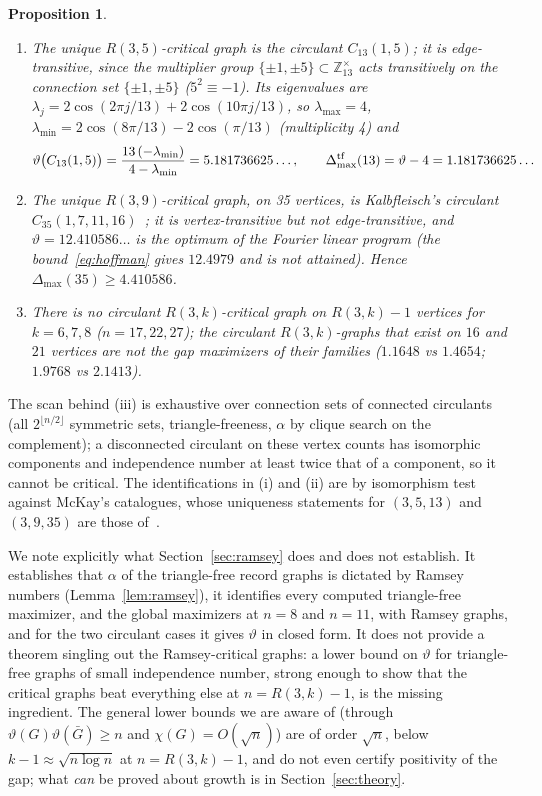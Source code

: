 \documentclass[11pt]{article}
\newtheorem{proposition}{Proposition}
\renewcommand{\theta}{\vartheta}
\newcommand{\gap}{\Delta}
\begin{document}
\begin{proposition}\label{prop:circ}
\begin{enumerate}
\item[(i)] The unique $R(3,5)$-critical graph is the circulant $C_{13}(1,5)$; it is edge-transitive, since the multiplier group $\{\pm1,\pm5\}\subset\mathbb Z_{13}^\times$ acts transitively on the connection set $\{\pm1,\pm5\}$ ($5^2\equiv-1$). Its eigenvalues are $\lambda_j=2\cos(2\pi j/13)+2\cos(10\pi j/13)$, so $\lambda_{\max}=4$, $\lambda_{\min}=2\cos(8\pi/13)-2\cos(\pi/13)$ (multiplicity 4) and
\begin{equation}
\theta\bigl(C_{13}(1,5)\bigr)=\frac{13\,(-\lambda_{\min})}{4-\lambda_{\min}}=5.181736625\ldots,\qquad \gap_{\max}^{\rm tf}(13)=\theta-4=1.181736625\ldots
\end{equation}
\item[(ii)] The unique $R(3,9)$-critical graph, on 35 vertices, is Kalbfleisch's circulant $C_{35}(1,7,11,16)$~\cite{kalbfleisch1966}; it is vertex-transitive but not edge-transitive, and $\theta=12.410586\ldots$ is the optimum of the Fourier linear program (the bound~\eqref{eq:hoffman} gives $12.4979$ and is not attained). Hence $\gap_{\max}(35)\ge 4.410586$. %
\item[(iii)] There is no circulant $R(3,k)$-critical graph on $R(3,k)-1$ vertices for $k=6,7,8$ ($n=17,22,27$); the circulant $R(3,k)$-graphs that exist on $16$ and $21$ vertices are not the gap maximizers of their families ($1.1648$ vs $1.4654$; $1.9768$ vs $2.1413$).
\end{enumerate}
\end{proposition}
The scan behind (iii) is exhaustive over connection sets of connected circulants (all $2^{\lfloor n/2\rfloor}$ symmetric sets, triangle-freeness, $\alpha$ by clique search on the complement); a disconnected circulant on these vertex counts has isomorphic components and independence number at least twice that of a component, so it cannot be critical. The identifications in (i) and (ii) are by isomorphism test against McKay's catalogues, whose uniqueness statements for $(3,5,13)$ and $(3,9,35)$ are those of~\cite{radziszowski}.

We note explicitly what Section~\ref{sec:ramsey} does and does not establish. It establishes that $\alpha$ of the triangle-free record graphs is dictated by Ramsey numbers (Lemma~\ref{lem:ramsey}), it identifies every computed triangle-free maximizer, and the global maximizers at $n=8$ and $n=11$, with Ramsey graphs, and for the two circulant cases it gives $\theta$ in closed form. It does not provide a theorem singling out the Ramsey-critical graphs: a lower bound on $\theta$ for triangle-free graphs of small independence number, strong enough to show that the critical graphs beat everything else at $n=R(3,k)-1$, is the missing ingredient. The general lower bounds we are aware of (through $\theta(G)\theta(\bar G)\ge n$ and $\chi(G)=O(\sqrt n)$) are of order $\sqrt n$, below $k-1\approx\sqrt{n\log n}$ at $n=R(3,k)-1$, and do not even certify positivity of the gap; what \emph{can} be proved about growth is in Section~\ref{sec:theory}.
\end{document}
